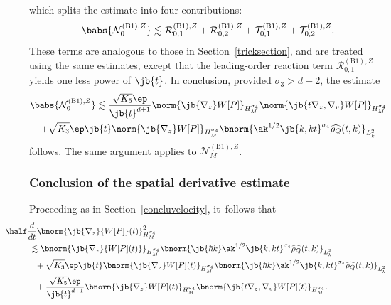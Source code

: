 which splits the estimate into four contributions: \[\babs{\mathcal{N}_0^{\mathrm{(B1)},Z}}\lesssim \mathcal{R}_{0,1}^{\mathrm{(B1)},Z}+\mathcal{R}_{0,2}^{\mathrm{(B1)},Z}+\mathcal{T}_{0,1}^{\mathrm{(B1)},Z}+\mathcal{T}_{0,2}^{\mathrm{(B1)},Z}.\]These terms are analogous to those in Section~\ref{tricksection}, and are treated using the same estimates, except that the leading-order reaction term $\mathcal{R}_{0,1}^{\mathrm{(B1)},Z}$ yields one less power of $\jb{t}$. In conclusion, provided $\sigma_3 > d + 2$, the estimate
\begin{multline*}
\babs{\mathcal{N}_0^{\mathrm{(B1)},Z}}\lesssim\frac{\sqrt{K_5}\ep}{\jb{t}^{d+1}}\norm{\jb{\nabla_z}W[P]}_{H^{\sigma_4}_M}\norm{\jb{t\nabla_z,\nabla_v}W[P]}_{H^{\sigma_4}_M}\\
+\sqrt{K_3}\ep\jb{t}\norm{\jb{\nabla_z}W[P]}_{H^{\sigma_4}_M}\bnorm{\ak^{1/2}\jb{k,kt}^{\sigma_4}\widehat{\rho_Q}(t,k)}_{L^2_k}
\end{multline*}
follows. The same argument applies to $\mathcal{N}_M^{\mathrm{(B1)},Z}$.

\subsubsection{Conclusion of the spatial derivative estimate}
Proceeding as in Section~\ref{concluvelocity}, it~follows that
\begin{align*}
&\hspace{-1cm}\half\frac{d}{dt}\bnorm{\jb{\nabla_z}{W[P]}(t)}_{H^{\sigma_4}_M}^2\\
&\lesssim\bnorm{\jb{\nabla_z}{W[P](t)}}_{H^{\sigma_4}_M}\bnorm{\jb{\hbar k}\ak^{1/2}\jb{k,kt}^{\sigma_4}\widehat{\rho_Q}(t,k)}_{L^2_{k}}\\
&\hspace{0.25cm}+\sqrt{K_3}\ep\jb{t}\bnorm{\jb{\nabla_z}W[P](t)}_{H^{\sigma_4}_M}\bnorm{\jb{\hbar k}\ak^{1/2}\jb{k,kt}^{\sigma_4}\widehat{\rho_Q}(t,k)}_{L^2_k}\\
&\hspace{0.25cm}+\frac{\sqrt{K_5}\ep}{\jb{t}^{d+1}}\bnorm{\jb{\nabla_z}W[P](t)}_{H^{\sigma_4}_M}\bnorm{\jb{t\nabla_z,\nabla_v}W[P](t)}_{H^{\sigma_4}_M}.
\end{align*}

